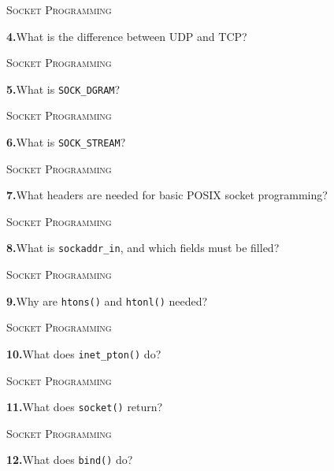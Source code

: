 \documentclass[11pt,a4paper]{article}
\newenvironment{questionblock}{%
  \begin{minipage}[t][0.455\textheight][t]{\textwidth}%
  \raggedright\small
}{%
  \vfill
  \end{minipage}%
}
\newcommand{\sectionlabel}[1]{\textsc{#1}\par\vspace{0.35em}}
\newcommand{\questionnumber}[1]{\textbf{#1.}\enspace}
\begin{document}
\newpage
\begin{questionblock}
\sectionlabel{Socket Programming}
\questionnumber{4}What is the difference between UDP and TCP?\par
\end{questionblock}
\vspace*{0.04\textheight}
\begin{questionblock}
\sectionlabel{Socket Programming}
\questionnumber{5}What is \verb|SOCK_DGRAM|?\par
\end{questionblock}
\newpage
\begin{questionblock}
\sectionlabel{Socket Programming}
\questionnumber{6}What is \verb|SOCK_STREAM|?\par
\end{questionblock}
\vspace*{0.04\textheight}
\begin{questionblock}
\sectionlabel{Socket Programming}
\questionnumber{7}What headers are needed for basic POSIX socket programming?\par
\end{questionblock}
\newpage
\begin{questionblock}
\sectionlabel{Socket Programming}
\questionnumber{8}What is \verb|sockaddr_in|, and which fields must be filled?\par
\end{questionblock}
\vspace*{0.04\textheight}
\begin{questionblock}
\sectionlabel{Socket Programming}
\questionnumber{9}Why are \verb|htons()| and \verb|htonl()| needed?\par
\end{questionblock}
\newpage
\begin{questionblock}
\sectionlabel{Socket Programming}
\questionnumber{10}What does \verb|inet_pton()| do?\par
\end{questionblock}
\vspace*{0.04\textheight}
\begin{questionblock}
\sectionlabel{Socket Programming}
\questionnumber{11}What does \verb|socket()| return?\par
\end{questionblock}
\newpage
\begin{questionblock}
\sectionlabel{Socket Programming}
\questionnumber{12}What does \verb|bind()| do?\par
\end{questionblock}
\end{document}
